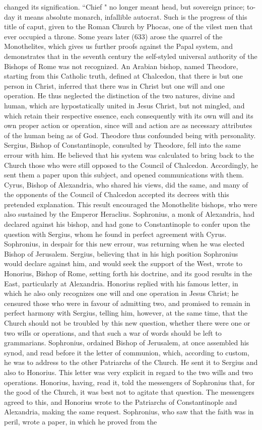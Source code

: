 changed its signification. “Chief " no longer meant head, but sovereign prince; to-day it means absolute monarch, infallible autocrat. Such is the progress of this title of caput, given to the Roman Church by Phocas, one of the vilest men that ever occupied a throne. Some years later (633) arose the quarrel of the Monothelites, which gives us further proofs against the Papal system, and demonstrates that in the seventh century the self-styled universal authority of the Bishops of Rome was not recognized. An Arabian bishop, named Theodore, starting from this Catholic truth, defined at Chalcedon, that there is but one person in Christ, inferred that there was in Christ but one will and one operation. He thus neglected the distinction of the two natures, divine and human, which are hypostatically united in Jesus Christ, but not mingled, and which retain their respective essence, each consequently with its own will and its own proper action or operation, since will and action are as necessary attributes of the human being as of God. Theodore thus confounded being with personality. Sergius, Bishop of Constantinople, consulted by Theodore, fell into the same errour with him. He believed that his system was calculated to bring back to the Church those who were still opposed to the Council of Chalcedon. Accordingly, he sent them a paper upon this subject, and opened communications with them. Cyrus, Bishop of Alexandria, who shared his views, did the same, and many of the opponents of the Council of Chalcedon accepted its decrees with this pretended explanation. This result encouraged the Monothelite bishops, who were also sustained by the Emperor Heraclius. Sophronius, a monk of Alexandria, had declared against his bishop, and had gone to Constantinople to confer upon the question with Sergius, whom he found in perfect agreement with Cyrus. Sophronius, in despair for this new errour, was returning when he was elected Bishop of Jerusalem. Sergius, believing that in his high position Sophronius would declare against him, and would seek the support of the West, wrote to Honorius, Bishop of Rome, setting forth his doctrine, and its good results in the East, particularly at Alexandria. Honorius replied with his famous letter, in which he also only recognizes one will and one operation in Jesus Christ; he censured those who were in favour of admitting two, and promised to remain in perfect harmony with Sergius, telling him, however, at the same time, that the Church should not be troubled by this new question, whether there were one or two wills or operations, and that such a war of words should be left to grammarians. Sophronius, ordained Bishop of Jerusalem, at once assembled his synod, and read before it the letter of communion, which, according to custom, he was to address to the other Patriarchs of the Church. He sent it to Sergius and also to Honorius. This letter was very explicit in regard to the two wills and two operations. Honorius, having, read it, told the messengers of Sophronius that, for the good of the Church, it was best not to agitate that question. The messengers agreed to this, and Honorius wrote to the Patriarchs of Constantinople and Alexandria, making the same request. Sophronius, who saw that the faith was in peril, wrote a paper, in which he proved from the 